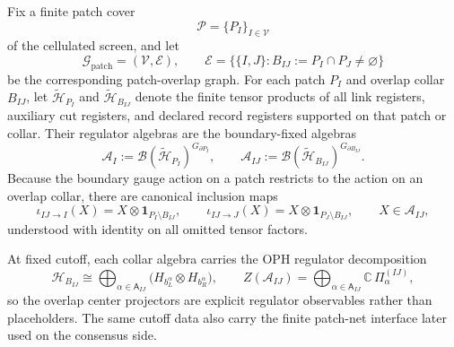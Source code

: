 \documentclass[11pt]{article}
\begin{document}
Fix a finite patch cover
\begin{equation}
\mathcal P=\{P_I\}_{I\in\mathcal V}
\end{equation}
of the cellulated screen, and let
\begin{equation}
\mathcal G_{\mathrm{patch}}=(\mathcal V,\mathcal E),
\qquad
\mathcal E=\bigl\{\{I,J\}: B_{IJ}:=P_I\cap P_J\neq \varnothing\bigr\}
\end{equation}
be the corresponding patch-overlap graph. For each patch $P_I$ and overlap collar $B_{IJ}$, let
$\widetilde{\mathcal H}_{P_I}$ and $\widetilde{\mathcal H}_{B_{IJ}}$ denote the finite tensor
products of all link registers, auxiliary cut registers, and declared record registers supported
on that patch or collar. Their regulator algebras are the boundary-fixed algebras
\begin{equation}
\mathcal A_I:=\mathcal B(\widetilde{\mathcal H}_{P_I})^{G_{\partial P_I}},
\qquad
\mathcal A_{IJ}:=\mathcal B(\widetilde{\mathcal H}_{B_{IJ}})^{G_{\partial B_{IJ}}}.
\end{equation}
Because the boundary gauge action on a patch restricts to the action on an overlap collar, there
are canonical inclusion maps
\begin{equation}
\iota_{IJ\to I}(X)=X\otimes \mathbf 1_{P_I\setminus B_{IJ}},
\qquad
\iota_{IJ\to J}(X)=X\otimes \mathbf 1_{P_J\setminus B_{IJ}},
\qquad
X\in \mathcal A_{IJ},
\end{equation}
understood with identity on all omitted tensor factors.

At fixed cutoff, each collar algebra carries the OPH regulator decomposition
\begin{equation}
\mathcal H_{B_{IJ}}
\cong
\bigoplus_{\alpha\in\mathsf A_{IJ}}
\bigl(H_{b_L^\alpha}\otimes H_{b_R^\alpha}\bigr),
\qquad
Z(\mathcal A_{IJ})
=
\bigoplus_{\alpha\in\mathsf A_{IJ}}\mathbb C\,\Pi_\alpha^{(IJ)},
\end{equation}
so the overlap center projectors are explicit regulator observables rather than
placeholders. The same cutoff data also carry the finite patch-net interface later used on the
consensus side.
\end{document}
